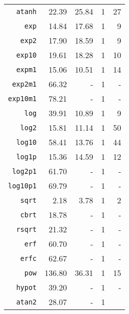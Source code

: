 \begin{table}
\begin{tabular}{r|rr|rr}
\texttt{atanh} & 22.39 & 25.84 & 1 & 27 \\
\texttt{exp} & 14.84 & 17.68 & 1 & 9 \\
\texttt{exp2} & 17.90 & 18.59 & 1 & 9 \\
\texttt{exp10} & 19.61 & 18.28 & 1 & 10 \\
\texttt{expm1} & 15.06 & 10.51 & 1 & 14 \\
\texttt{exp2m1} & 66.32 & - & 1 & - \\
\texttt{exp10m1} & 78.21 & - & 1 & - \\
\texttt{log} & 39.91 & 10.89 & 1 & 9 \\
\texttt{log2} & 15.81 & 11.14 & 1 & 50 \\
\texttt{log10} & 58.41 & 13.76 & 1 & 44 \\
\texttt{log1p} & 15.36 & 14.59 & 1 & 12 \\
\texttt{log2p1} & 61.70 & - & 1 & - \\
\texttt{log10p1} & 69.79 & - & 1 & - \\
\texttt{sqrt} & 2.18 & 3.78 & 1 & 2 \\
\texttt{cbrt} & 18.78 & - & 1 & - \\
\texttt{rsqrt} & 21.32 & - & 1 & - \\
\texttt{erf} & 60.70 & - & 1 & - \\
\texttt{erfc} & 62.67 & - & 1 & - \\
\texttt{pow} & 136.80 & 36.31 & 1 & 15 \\
\texttt{hypot} & 39.20 & - & 1 & - \\
\texttt{atan2} & 28.07 & - & 1 & \\
\end{tabular}
\end{table}
